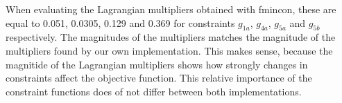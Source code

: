 When evaluating the Lagrangian multipliers obtained with fmincon, these are equal to 0.051, 0.0305, 0.129 and 0.369 for constraints $g_{1a}$, $g_{4a}$, $g_{5a}$ and $g_{5b}$ respectively. The magnitudes of the multipliers matches the magnitude of the multipliers found by our own implementation. This makes sense, because the magnitide of the Lagrangian multipliers shows how strongly changes in constraints affect the objective function. This relative importance of the constraint functions does of not differ between both implementations.



